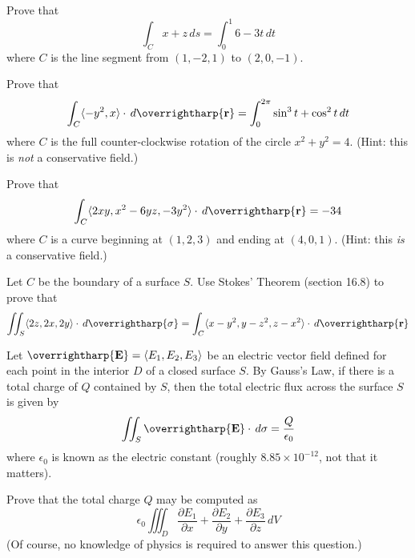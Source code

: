 \documentclass[12pt]{exam}
\newcommand{\harpvec}[1]{\overrightharp{\ensuremath{\mathbf{#1}}}}
\newcommand{\vect}[1]{\harpvec{#1}}
\newcommand{\<}{\langle}
\renewcommand{\>}{\rangle}
\begin{document}
\begin{questions}

\setcounter{question}{0}

\question[6]
  Prove that \[\int_C x+z\,d{s}=\int_0^1 6-3t\,d{t}\]
  where \(C\) is the line segment from \((1,-2,1)\) to \((2,0,-1)\).

\newpage

\question[6]
  Prove that
    \[
      \int_C \<-y^2,x\>\cdot\,d\vect{r}
        =
      \int_0^{2\pi} \sin^3 t + \cos^2 t\,dt
    \]
  where \(C\) is the full counter-clockwise rotation of the circle
  \(x^2+y^2=4\). (Hint: this is \textit{not} a conservative field.)

\newpage

\question[6] %
  Prove that
    \[
      \int_C \<2xy,x^2-6yz,-3y^2\>\cdot\,d\vect{r}
        =
      -34
    \]
  where \(C\) is a curve beginning at \((1,2,3)\) and ending at
  \((4,0,1)\). (Hint: this \textit{is} a conservative field.)

\newpage

\question[6]
  Let \(C\) be the boundary of a surface \(S\).
  Use Stokes' Theorem (section 16.8) to prove that
    \[
      \iint_S \<2z,2x,2y\>\cdot\,d\vect{\sigma}
        =
      \int_C \<x-y^2,y-z^2,z-x^2\>\cdot\,d\vect{r}
    \]

\newpage

\question[6]
  Let \(\vect{E}=\<E_1,E_2,E_3\>\) be an electric vector field defined for
  each point in the interior \(D\) of a closed surface \(S\).
  By Gauss's Law, if there is a total charge of \(Q\) contained
  by \(S\), then the total
  electric flux across the surface \(S\) is given by
    \[
      \iint_S \vect{E}\cdot\,d{\sigma} = \frac{Q}{\epsilon_0}
    \]
  where \(\epsilon_0\) is known as the electric constant (roughly
  \(8.85\times 10^{-12}\), not that it matters).

  Prove that the total charge \(Q\) may be computed as
    \[
      \epsilon_0\iiint_D
        \frac{\partial E_1}{\partial x} +
        \frac{\partial E_2}{\partial y} +
        \frac{\partial E_3}{\partial z}
      \,d{V}
    \]
  (Of course, no knowledge of physics is required to answer this question.)



\end{questions}
\end{document}
